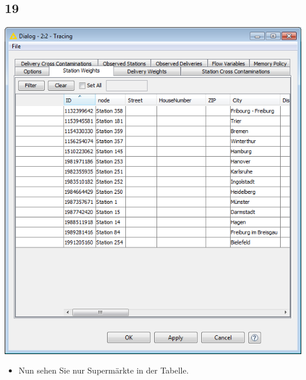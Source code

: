 \documentclass{beamer}
\begin{document}
\subsection{19}
\begin{frame}
	\begin{center}
  		\includegraphics[height=0.6\textheight]{19.png}
	\end{center}
	\begin{itemize}
		\item Nun sehen Sie nur Supermärkte in der Tabelle.
	\end{itemize}
\end{frame}
\end{document}
